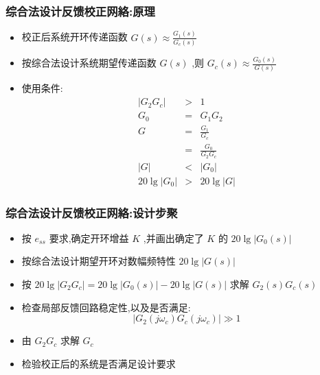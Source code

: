 \documentclass[table]{beamer}
\begin{document}
\begin{frame}
\frametitle{综合法设计反馈校正网絡:原理}
\label{sec-3-4}

\begin{itemize}
\item 校正后系统开环传递函数  $G(s)\approx\frac{G_1(s)}{G_c(s)}$
\item <2->按综合法设计系统期望传递函数  $G(s)$  ,则 $G_c(s)\approx\frac{G_0(s)}{G(s)}$
\item <3->使用条件:
     \begin{eqnarray*}
      |G_2 G_c| & > & 1 \\
      G_0 & = & G_1 G_2 \\
      G &=& \frac{G_1}{G_c}\\
        &=& \frac{G_0}{G_2 G_c} \\
      |G| & <& | G_{0} | \\ 
      20\lg|G_0|&>&20\lg|G|
     \end{eqnarray*}
\end{itemize}
\end{frame}
\begin{frame}
\frametitle{综合法设计反馈校正网絡:设计步聚}
\label{sec-3-5}

\begin{itemize}
\item 按  $e_{ss}$  要求,确定开环增益 $K$  ,并画出确定了 $K$  的 $20\lg|G_0(s)|$
\item 按综合法设计期望开环对数幅频特性 $20\lg|G(s)|$
\item <2->按  $20\lg|G_2 G_c|=20\lg|G_0(s)|-20\lg |G(s)|$  求解  $G_2(s)G_c(s)$
\item <3->检查局部反馈回路稳定性,以及是否满足:  
           \[|G_2(j\omega_c)G_c(j\omega_c)|\gg 1\]
\item <4->由 $G_2G_c$ 求解 $G_c$
\item <5->检验校正后的系统是否满足设计要求
\end{itemize}
\end{frame}
\end{document}
